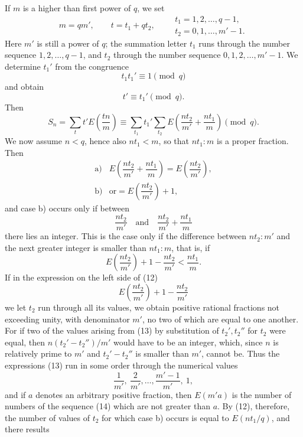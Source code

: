 \documentclass[11pt]{article}
\begin{document}
If $m$ is a higher than first power of $q$, we set
\[
m=qm',\qquad t=t_1+qt_2,
\qquad
\begin{array}{l}
t_1=1,2,\ldots,q-1,\\
t_2=0,1,\ldots,m'-1.
\end{array}
\]
Here $m'$ is still a power of $q$; the summation letter $t_1$ runs through the number sequence $1,2,\ldots,q-1$, and $t_2$ through the number sequence $0,1,2,\ldots,m'-1$. We determine $t_1'$ from the congruence
\[
t_1t_1'\equiv1\pmod q
\]
and obtain
\[
t'\equiv t_1'\pmod q.
\]
Then
\begin{equation}
S_n=\sum_t t'E\left(\frac{tn}{m}\right)
\equiv
\sum_{t_1}t_1'\sum_{t_2}E\left(\frac{nt_2}{m'}+\frac{nt_1}{m}\right)
\pmod q.
\tag{11}
\end{equation}
We now assume $n<q$, hence also $nt_1<m$, so that $nt_1:m$ is a proper fraction. Then
\[
\begin{array}{ll}
\text{a)}& E\left(\dfrac{nt_2}{m'}+\dfrac{nt_1}{m}\right)=E\left(\dfrac{nt_2}{m'}\right),\\[1.2em]
\text{b)}& \text{or}=E\left(\dfrac{nt_2}{m'}\right)+1,
\end{array}
\]
and case b) occurs only if between
\[
\frac{nt_2}{m'}\quad\text{and}\quad \frac{nt_2}{m'}+\frac{nt_1}{m}
\]
there lies an integer. This is the case only if the difference between $nt_2:m'$ and the next greater integer is smaller than $nt_1:m$, that is, if
\begin{equation}
E\left(\frac{nt_2}{m'}\right)+1-\frac{nt_2}{m'}<\frac{nt_1}{m}.
\tag{12}
\end{equation}
If in the expression on the left side of (12)
\begin{equation}
E\left(\frac{nt_2}{m'}\right)+1-\frac{nt_2}{m'}
\tag{13}
\end{equation}
we let $t_2$ run through all its values, we obtain positive rational fractions not exceeding unity, with denominator $m'$, no two of which are equal to one another. For if two of the values arising from (13) by substitution of $t_2',t_2''$ for $t_2$ were equal, then $n(t_2'-t_2'')/m'$ would have to be an integer, which, since $n$ is relatively prime to $m'$ and $t_2'-t_2''$ is smaller than $m'$, cannot be. Thus the expressions (13) run in some order through the numerical values
\begin{equation}
\frac1{m'},\ \frac2{m'},\ldots,\frac{m'-1}{m'},\ 1,
\tag{14}
\end{equation}
and if $a$ denotes an arbitrary positive fraction, then $E(m'a)$ is the number of numbers of the sequence (14) which are not greater than $a$. By (12), therefore, the number of values of $t_2$ for which case b) occurs is equal to $E(nt_1/q)$, and there results
\end{document}
